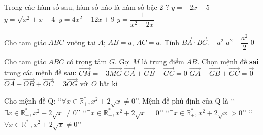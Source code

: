 \begin{ex}%
	Trong các hàm số sau, hàm số nào là hàm số bậc 2 ?
	\choice
	{$y=-2x-5$}
	{$y=\sqrt{x^2+x+4}$}
	{\True $y=4x^2-12x+9$}
	{$y=\dfrac{1}{x^2-2x}$}
\end{ex}

\begin{ex}%
	Cho tam giác $ABC$ vuông tại $A$; $AB=a$, $AC=a$. Tính $\vec{BA}\cdot\vec{BC}$.
	\choice
	{$-a^2$}
	{\True $a^2$}
	{$-\dfrac{a^2}{2}$}
	{$0$}
\end{ex}

\begin{ex}%
	Cho tam giác $ABC$ có trọng tâm $G$. Gọi $M$ là trung điểm $AB$. Chọn mệnh đề \textbf{sai} trong các mệnh đề sau:
	\choice
	{$\vec{CM}=-3\vec{MG}$}
	{\True $\vec{GA}+\vec{GB}+\vec{GC}={0}$}
	{$\vec{GA}+\vec{GB}+\vec{GC}=\vec{0}$}
	{$\vec{OA}+\vec{OB}+\vec{OC}=3\vec{OG}$ với $O$ bất kì}
\end{ex}

\begin{ex}%
	Cho mệnh đề $\mathrm{Q}$: \lq\lq $\forall x \in \mathbb{R}^{\ast}_{+}, x^2+2\sqrt{x}\neq 0  $\rq \rq. Mệnh đề phủ định của $\mathrm{Q}$ là
	\choice
	{\lq\lq $\exists x \in \mathbb{R}^{\ast}_{+}, x^2+2\sqrt{x}\neq 0  $\rq \rq}
	{\True \lq\lq $\exists x \in \mathbb{R}^{\ast}_{+}, x^2+2\sqrt{x}= 0  $\rq \rq}
	{\lq\lq $\exists x \in \mathbb{R}^{\ast}_{+}, x^2+2\sqrt{x}> 0  $\rq \rq }
	{\lq\lq $\forall x \in \mathbb{R}^{\ast}_{+}, x^2+2\sqrt{x}\neq 0  $\rq \rq}
\end{ex}

